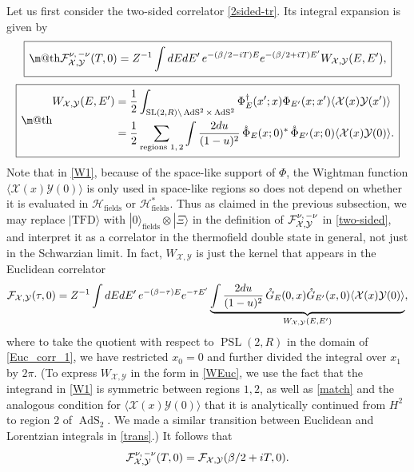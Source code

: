 \documentclass[11pt]{article}
\makeatletter
\newcommand{\be}{\begin{equation}}
\newcommand{\ee}{\end{equation}}
\newcommand*{\wideboxed}[1]{\setlength{\fboxsep}{1ex}%
  \fbox{\m@th$\displaystyle#1$}}
\newcommand*{\ket}[1]{|{#1}\rangle}
\newcommand*{\corr}[1]{\langle{#1}\rangle}
\newcommand{\calF}{\mathcal{F}}
\newcommand{\calH}{\mathcal{H}}
\newcommand{\calX}{\mathcal{X}}
\newcommand{\calY}{\mathcal{Y}}
\newcommand{\RR}{\mathbb{R}}
\DeclareMathOperator{\PSL}{PSL}
\DeclareMathOperator{\tSL}{\widetilde{\mathrm{SL}}}
\DeclareMathOperator{\tAdS}{\widetilde{AdS}}
\DeclareMathOperator{\HH}{H}
\newcommand{\bt}{\beta}
\newcommand{\rG}{\mathring{G}}
\newcommand{\ov}{\over}
\def\widetilde#1{#1}%
\def\HH{H}
\def\RR{R}
\makeatother
\begin{document}
Let us first consider the two-sided correlator \eqref{2sided-tr}. Its integral expansion is given by
\be \label{2sided_int}
\wideboxed{
\tensor*{\calF}{*^{\nu,\, -\nu}_{\calX,\calY}}(T,0)=Z^{-1}\int dE dE' \,e^{-(\bt/2-i T)E}e^{-(\bt/2+iT)E'} W_{\calX, \calY}(E,E'),
}
\ee
\be 
\wideboxed{\begin{aligned}\label{W1}
W_{\calX, \calY}(E,E')&= {1 \ov 2}\int_{\tSL(2,\RR)\backslash \tAdS^2 \times \tAdS^2}\Phi^{\dagger}_{E}(x'; x)\Phi_{E'}(x;x')\corr{\calX(x)\calY(x')}\\
&={1 \ov 2}\sum_{\text{regions $1,2$}}\int{2 du \ov (1-u)^2}\, \mathring{\Phi}_{E}(x;0)^*\, \mathring{\Phi}_{E'}(x;0)\corr{\calX(x)\calY(0)}.
\end{aligned}} 
\ee
Note that in \eqref{W1}, because of the space-like support of $\Phi$, the Wightman function $\corr{\calX(x)\calY(0)}$ is only used in space-like regions so does not depend on whether it is evaluated in $\calH_{\text{fields}}$ or $\calH_{\text{fields}}^*$. Thus as claimed in the previous subsection, we may replace $\ket{\text{TFD}}$ with $\ket{0}_{\text{fields}}\otimes \ket{\Xi}$ in the definition of $\tensor*{\calF}{*^{\nu,\, -\nu}_{\calX,\calY}}$ in \eqref{two-sided}, and interpret it as a correlator in the thermofield double state in general, not just in the Schwarzian limit. In fact, $W_{\calX, \calY}$ is just the kernel that appears in the Euclidean correlator
\be \label{WEuc}
\calF_{\calX, \calY}(\tau,0)=Z^{-1}\int dE dE'\, e^{-(\beta-\tau)E}e^{-\tau E'} \underbrace{\int {2du \ov (1-u)^2}\,\rG_E(0,x)\rG_{E'}(x,0)\corr{\calX(x)\calY(0)}}_{W_{\calX, \calY}(E,E')},
\ee
where to take the quotient with respect to $\PSL(2,\RR)$ in the domain of \eqref{Euc_corr_1}, we have restricted $x_0=0$ and further divided the integral over $x_1$ by $2\pi$. (To express $W_{\calX, \calY}$ in the form in \eqref{WEuc}, we use the fact that the integrand in \eqref{W1} is symmetric between regions $1,2$, as well as \eqref{match} and the analogous condition for $\corr{\calX(x)\calY(0)}$ that it is analytically continued from $\HH^2$ to region $2$ of $\tAdS_2$. We made a similar transition between Euclidean and Lorentzian integrals in \eqref{trans}.) It follows that
\be
\tensor*{\calF}{*^{\nu,\, -\nu}_{\calX,\calY}}(T,0)=\calF_{\calX, \calY}(\bt/2+i T,0).
\ee
\end{document}
